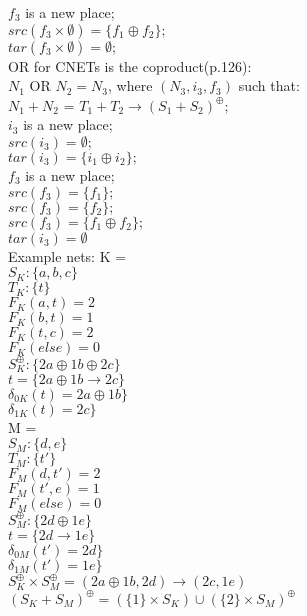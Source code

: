 $f_3$ is a new place;\\
$src(f_3\times \emptyset) = \{f_1 \oplus f_2\};$\\
$tar(f_3\times \emptyset) = \emptyset;$ \bigskip\\
OR for CNETs is the coproduct(p.126):\\
$N_1$ OR $N_2 = N_3$, where $(N_3,  i_3, f_3)$ such that:\\
$N_1 + N_2$ = $T_1 + T_2 \rightarrow (S_1 + S_2)^\oplus$;\\
$i_3$ is a new place;\\
$src(i_3) = \emptyset;$\\
$tar(i_3) =\{i_1 \oplus i_2\};$\\
$f_3$ is a new place;\\
$src(f_3) = \{f_1\};$\\
$src(f_3) = \{f_2\};$\\
$src(f_3) = \{f_1 \oplus f_2\};$\\
$tar(i_3) =\emptyset$\bigskip\\
Example nets:
%
K = \\
$S_K :\{ a, b, c\}$\\
$T_K :\{t\}$\\  
$F_K (a, t) = 2$\\
$F_K (b, t) = 1$\\
$F_K (t, c) = 2$\\
$F_K (else) = 0$\\
%
$S_K^\oplus :\{ 2a \oplus 1b \oplus 2c\}$\\
$t = \{ 2a \oplus 1b \rightarrow 2c \}$\\  
$\delta_{0K} (t) = 2a \oplus 1b \}$\\
$\delta_{1K} (t) = 2c \}$\\
\smallskip
M = \\
$S_M :\{d,e\}$\\
$T_M :\{t'\}$\\  
$F_M (d, t') = 2$\\
$F_M (t', e) = 1$\\
$F_M (else) = 0$\\
%
$S_M^\oplus :\{ 2d \oplus 1e\}$\\
$t = \{ 2d \rightarrow 1e \}$\\  
$\delta_{0M} (t') = 2d \}$\\
$\delta_{1M} (t') = 1e \}$\\
\smallskip
$S_K^\oplus \times S_M^\oplus = (2a \oplus 1b, 2d) \rightarrow (2c, 1e)$\\
\smallskip
$(S_K + S_M)^\oplus = (\{1\} \times S_K) \cup (\{2\} \times S_M)^\oplus$\\
